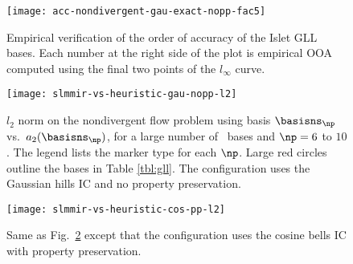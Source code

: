 \begin{figure}[tbh]
  \centering
  \texttt{[image: acc-nondivergent-gau-exact-nopp-fac5]}
  \caption{
    Empirical verification of the order of accuracy of the Islet GLL bases.
    Each number at the right side of the plot is empirical OOA computed using the final two points of the $l_\infty$ curve.
  }
  \label{fig:islet-empirical-ooa}
\end{figure}

\begin{figure}[tbh]
  \centering
  \texttt{[image: slmmir-vs-heuristic-gau-nopp-l2]}
  \caption{$l_2$ norm on the nondivergent flow problem
    using basis $\basisns_{\np}$ vs.~$a_2(\basisns_{\np})$,
    for a large number of \abtps~bases and $\np=6$ to $10$.
    The legend lists the marker type for each $\np$.
    Large red circles outline the bases in Table \ref{tbl:gll}.
    The configuration uses the Gaussian hills IC and no property preservation.}
  \label{fig:slmmir-vs-heuristic-a}
\end{figure}
\begin{figure}[tbh]
  \centering
  \texttt{[image: slmmir-vs-heuristic-cos-pp-l2]}
  \caption{Same as Fig.~\ref{fig:slmmir-vs-heuristic-a} except that the configuration
    uses the cosine bells IC with property preservation.}
  \label{fig:slmmir-vs-heuristic-b}
\end{figure}

